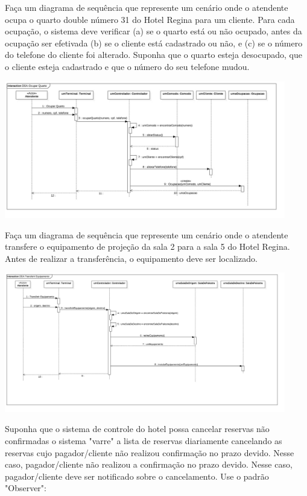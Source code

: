 \documentclass[12pt]{exam}
\begin{document}
\begin{questions}
	\question Faça um diagrama de sequência que represente um cenário onde o atendente ocupa o quarto double número 31 do Hotel Regina para um cliente. Para cada ocupação, o sistema deve verificar (a) se o quarto está ou não ocupado, antes da ocupação ser efetivada (b) se o cliente está cadastrado ou não, e (c) se o número do telefone do cliente foi alterado. Suponha que o quarto esteja desocupado, que o cliente esteja cadastrado e que o número do seu telefone mudou.
	\begin{solution}
	   \includegraphics[width=0.92\textwidth]{imagens/exercicios-hotel-regina-2-solucao-e2.jpg}
	\end{solution}
	\pagebreak
	\question Faça um diagrama de sequência que represente um cenário onde o atendente transfere o equipamento de projeção da sala 2 para a sala 5 do Hotel Regina. Antes de realizar a transferência, o equipamento deve ser localizado.
	\begin{solution}
	   \includegraphics[width=0.92\textwidth]{imagens/exercicios-hotel-regina-2-solucao-e3.jpg}
	\end{solution}
	\pagebreak
	\question Suponha que o sistema de controle do hotel possa cancelar reservas não confirmadas o sistema "varre" a lista de reservas diariamente cancelando as reservas cujo pagador/cliente não realizou confirmação no prazo devido. Nesse caso, pagador/cliente  não realizou a confirmação no prazo devido. Nesse caso, pagador/cliente deve ser notificado sobre o cancelamento. Use o padrão "Observer":

\end{questions}
\end{document}
